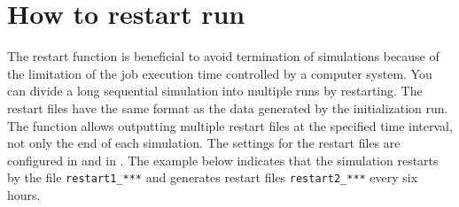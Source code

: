 \section{How to restart run}\label{sec:restart}
The restart function is beneficial to avoid termination of simulations because of the limitation of the job execution time controlled by a computer system.
You can divide a long sequential simulation into multiple runs by restarting. The restart files have the same format as the data generated by the initialization run. The function allows outputting multiple restart files at the specified time interval, not only the end of each simulation.
The settings for the restart files are configured in  and  in \runconf.
The example below indicates that the simulation restarts by the file \verb|restart1_***| and generates restart files \verb|restart2_***| every six hours.

